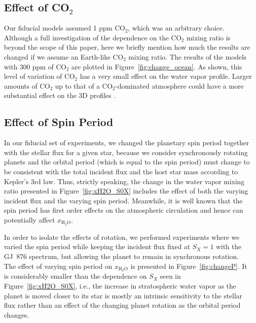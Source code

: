 \documentclass[11pt,numberedappendix,twocolappendix,]{emulateapj}
\def\water{H$_2$O}
\def\xwater{$x_\text{\water}$}
\def\wv{water vapor}
\begin{document}
\subsection{Effect of CO$_2$}
\label{ss:sensitivity_ocean}

Our fiducial models assumed 1 ppm CO$_2$, which was an arbitrary choice. 
Although a full investigation of the dependence on the CO$_2$ mixing ratio is beyond the scope of this paper, here we briefly mention how much the results are changed if we assume an Earth-like CO$_2$ mixing ratio. 
The results of the models with 300 ppm of CO$_2$ are plotted in Figure~\ref{fig:change_ocean}. 
As shown, this level of variation of CO$_2$ has a very small effect on the \wv{} profile. 
Larger amounts of CO$_2$ up to that of a CO$_2$-dominated atmosphere could have a more substantial effect on the 3D profiles \citep{Wordsworth2013}. 


\subsection{Effect of Spin Period}
\label{ss:sensitivity_Porbit}

In our fiducial set of experiments, we changed the planetary spin period together with the stellar flux for a given star, because we consider synchronously rotating planets and the orbital period (which is equal to the spin period) must change to be consistent with the total incident flux and the host star mass according to Kepler's 3rd law. 
Thus, strictly speaking, the change in the \wv{} mixing ratio presented in Figure~\ref{fig:xH2O_S0X} includes the effect of both the varying incident flux and the varying spin period. 
Meanwhile, it is well known that the spin period has first order effects on the atmospheric circulation and hence can potentially affect \xwater{}. 

In order to isolate the effects of rotation, we performed experiments where we varied the spin period while keeping the incident flux fixed at $S_X=1$ with the GJ~876 spectrum, but allowing the planet to remain in synchronous rotation. 
The effect of varying spin period on \xwater{} is presented in Figure~\ref{fig:changeP}. 
It is considerably smaller than the dependence on $S_X$ seen in Figure~\ref{fig:xH2O_S0X}, i.e., the increase in stratospheric water vapor as the planet is moved closer to its star is mostly an intrinsic sensitivity to the stellar flux rather than an effect of the changing planet rotation as the orbital period changes. 
\end{document}
